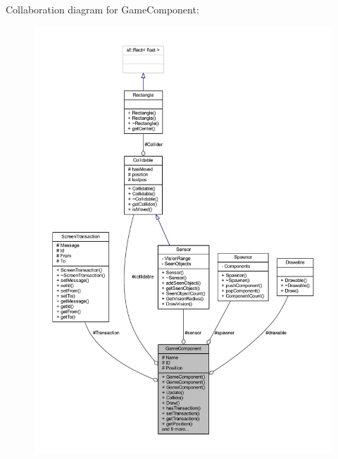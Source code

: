 Collaboration diagram for Game\-Component\-:
\nopagebreak
\begin{figure}[H]
\begin{center}
\leavevmode
\includegraphics[width=350pt]{class_game_component__coll__graph}
\end{center}
\end{figure}

